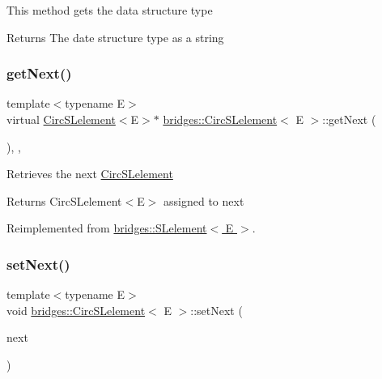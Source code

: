 This method gets the data structure type

\begin{DoxyReturn}{Returns}
The date structure type as a string 
\end{DoxyReturn}
\hypertarget{classbridges_1_1_circ_s_lelement_aab863627c125c6f1075af7e7b7f340cf}{}\label{classbridges_1_1_circ_s_lelement_aab863627c125c6f1075af7e7b7f340cf} 
\subsubsection{\texorpdfstring{get\+Next()}{getNext()}}
{\footnotesize\ttfamily template$<$typename E$>$ \\
virtual \hyperlink{classbridges_1_1_circ_s_lelement}{Circ\+S\+Lelement}$<$E$>$$\ast$ \hyperlink{classbridges_1_1_circ_s_lelement}{bridges\+::\+Circ\+S\+Lelement}$<$ E $>$\+::get\+Next (\begin{DoxyParamCaption}{ }\end{DoxyParamCaption})\hspace{0.3cm}{\ttfamily [inline]}, {\ttfamily [override]}, {\ttfamily [virtual]}}

Retrieves the next \hyperlink{classbridges_1_1_circ_s_lelement}{Circ\+S\+Lelement} \begin{DoxyReturn}{Returns}
Circ\+S\+Lelement$<$\+E$>$ assigned to next 
\end{DoxyReturn}


Reimplemented from \hyperlink{classbridges_1_1_s_lelement_a5bd74108a9aa49339378bf62cdbb19ca}{bridges\+::\+S\+Lelement$<$ E $>$}.

\hypertarget{classbridges_1_1_circ_s_lelement_a7b2512dd1cc559f0a89d9ab4aafed172}{}\label{classbridges_1_1_circ_s_lelement_a7b2512dd1cc559f0a89d9ab4aafed172} 
\subsubsection{\texorpdfstring{set\+Next()}{setNext()}}
{\footnotesize\ttfamily template$<$typename E$>$ \\
void \hyperlink{classbridges_1_1_circ_s_lelement}{bridges\+::\+Circ\+S\+Lelement}$<$ E $>$\+::set\+Next (\begin{DoxyParamCaption}\item[{\hyperlink{classbridges_1_1_circ_s_lelement}{Circ\+S\+Lelement}$<$ E $>$ $\ast$}]{next }\end{DoxyParamCaption})\hspace{0.3cm}{\ttfamily [inline]}}

